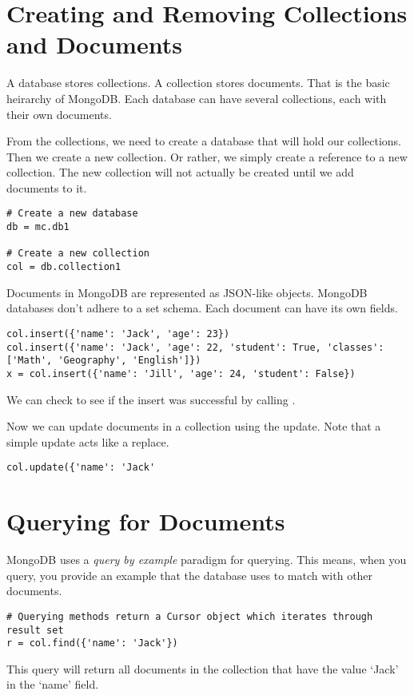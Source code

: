 \section*{Creating and Removing Collections and Documents}
A database stores collections.
A collection stores documents.
That is the basic heirarchy of MongoDB.
Each database can have several collections, each with their own documents.

From the collections, we need to create a database that will hold our collections.
Then we create a new collection.
Or rather, we simply create a reference to a new collection.
The new collection will not actually be created until we add documents to it.
\begin{lstlisting}
# Create a new database
db = mc.db1

# Create a new collection
col = db.collection1
\end{lstlisting}

Documents in MongoDB are represented as JSON-like objects.
MongoDB databases don't adhere to a set schema.
Each document can have its own fields.
\begin{lstlisting}
col.insert({'name': 'Jack', 'age': 23})
col.insert({'name': 'Jack', 'age': 22, 'student': True, 'classes': ['Math', 'Geography', 'English']})
x = col.insert({'name': 'Jill', 'age': 24, 'student': False})
\end{lstlisting}
We can check to see if the insert was successful by calling .

Now we can update documents in a collection using the update.
Note that a simple update acts like a replace.
\begin{lstlisting}
col.update({'name': 'Jack'
\end{lstlisting}



\section*{Querying for Documents}
MongoDB uses a \emph{query by example} paradigm for querying.
This means, when you query, you provide an example that the database uses to match with other documents.
\begin{lstlisting}
# Querying methods return a Cursor object which iterates through result set
r = col.find({'name': 'Jack'})
\end{lstlisting}
This query will return all documents in the collection that have the value `Jack' in the `name' field.


